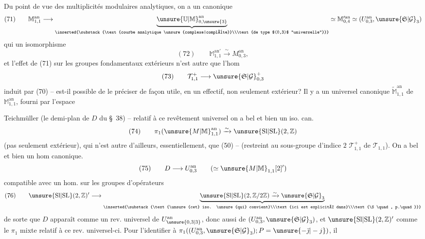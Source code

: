 Du point de vue des multiplicités modulaires analytiques, on a un  canonique
\[
(71)\qquad \mathbb M^{\mathrm{an}}_{1,1}\longrightarrow
\underbrace{\unsure{\mathbb U|\mathbb M}^{\mathrm{an}}_{0,\unsure{3}}}_{\inserted{\substack{\text{courbe analytique \unsure{complexe|complète}}\\\text{de type $(0,3)$ ``universelle''}}}}
\simeq \mathbb M^{\prime\mathrm{an}}_{0,4}\simeq(U^{\mathrm{an}}_{0,3},\unsure{\mathfrak S|\mathcal G}_3)
\]
 qui  un isomorphisme
\[
(72)\qquad \mathbb M^{\mathrm{an}\prime}_{1,1}\xrightarrow{\sim} M^{\mathrm{an}}_{0,3},
\]
et l'effet de (71) sur les groupes fondamentaux extérieurs n'est autre que l'hom 
\[
(73)\qquad \mathcal T^+_{1,1}\longrightarrow\unsure{\mathfrak S|\mathcal G}^+_{0,3}
\]
induit par (70) -- est-il possible de le préciser de façon utile, en un  effectif, non seulement extérieur? Il y a un  universel canonique $\widetilde{\mathbb M}^{\mathrm{an}}_{1,1}$ de $\mathbb M^{\mathrm{an}}_{1,1}$, fourni par l'espace 


Teichmüller (le demi-plan de  $D$ du \S\ 38) -- relatif à ce revêtement universel on a bel et bien un iso. can.
\[
(74)\qquad \pi_1(\unsure{M|\mathbb M}^{\mathrm{an}}_{1,1})\xrightarrow{\sim}\unsure{\mathrm{Sl}|\mathrm{SL}}(2,\mathbb Z)
\]
(pas seulement extérieur), qui n'est autre d'ailleurs, essentiellement, que (50) -- (restreint au sous-groupe d'indice $2$ $\mathcal T^+_{1,1}$ de $\mathcal T_{1,1}$). On a bel et bien un hom canonique.
\[
(75)\qquad D\longrightarrow U^{\mathrm{an}}_{0,3}\qquad(\simeq \unsure{M|\mathbb M}_{1,1}[2]')
\]
compatible avec un hom. sur les groupes d'opérateurs
\[
(76)\qquad \unsure{\mathrm{Sl}|\mathrm{SL}}(2,\mathbb Z)'\longrightarrow
\underbrace{\unsure{\mathrm{Sl}|\mathrm{SL}}(2,\mathbb Z/2\mathbb Z)\xrightarrow{\sim}\unsure{\mathfrak S|\mathcal G}_3}_{\inserted{\substack{\text{\unsure{cet} iso. \unsure{qui} convient}\\\text{ici est explicité dans}\\\text{\S\quad, p.\quad}}}}
\]
de sorte que $D$ apparaît comme un rev. universel de $U^{\mathrm{an}}_{\unsure{0,3|3}}$, donc aussi de $(U^{\mathrm{an}}_{0,3},\unsure{\mathfrak S|\mathcal G}_3)$, et $\unsure{\mathrm{Sl}|\mathrm{SL}}(2,\mathbb Z)'$ comme le $\pi_1$ mixte relatif à ce rev. universel-ci. Pour  l'identifier à $\pi_1((U^{\mathrm{an}}_{0,3},\unsure{\mathfrak S|\mathcal G}_3);P=\unsure{-\bar{\jmath}|-j})$, il
